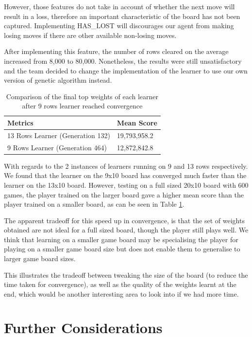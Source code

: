\documentclass[a4paper,12pt,twocolumn]{article}
\begin{document}
However, those features do not take in account of whether the next move will result
in a loss, therefore an important characteristic of the board has not been captured.
Implementing HAS\_LOST will discourages our agent from making losing moves if
there are other available non-losing moves.

After implementing this feature, the number of rows cleared on the average increased
from 8,000 to 80,000. Nonetheless, the results were still unsatisfactory and the team
decided to change the implementation of the learner to use our own version of genetic
algorithm instead.

\begin{table}[h]
	\centering
	\begin{tabular}{|l|l|}
		\hline
		\textbf{Metrics}                 & \textbf{Mean Score} \\
		\hline
		13 Rows Learner (Generation 132) & 19,793,958.2        \\
		\hline
		9 Rows Learner (Generation 464)  & 12,872,842.8        \\
		\hline
	\end{tabular}
	\caption{
		Comparison of the final top weights of each learner after 9 rows learner
		reached convergence
	}
	\label{learner_comparison}
\end{table}

With regards to the 2 instances of learners running on 9 and 13 rows respectively.
We found that the learner on the 9x10 board has converged much faster than the
learner on the 13x10 board. However, testing on a full sized 20x10 board with 600 games,
the player trained on the larger board gave a higher mean score than the player
trained on a smaller board, as can be seen in Table \ref{learner_comparison}.

The apparent tradeoff for this speed up in convergence, is that the set of weights
obtained are not ideal for a full sized board, though the player still plays well.
We think that learning on a smaller game board may be specialising the player for playing on
a smaller game board size but does not enable them to generalise to larger game board sizes.

This illustrates the tradeoff between tweaking the size of the board (to
reduce the time taken for convergence), as well as the quality of the weights
learnt at the end, which would be another interesting area to look into if we had
more time.

\section{Further Considerations}
\end{document}
